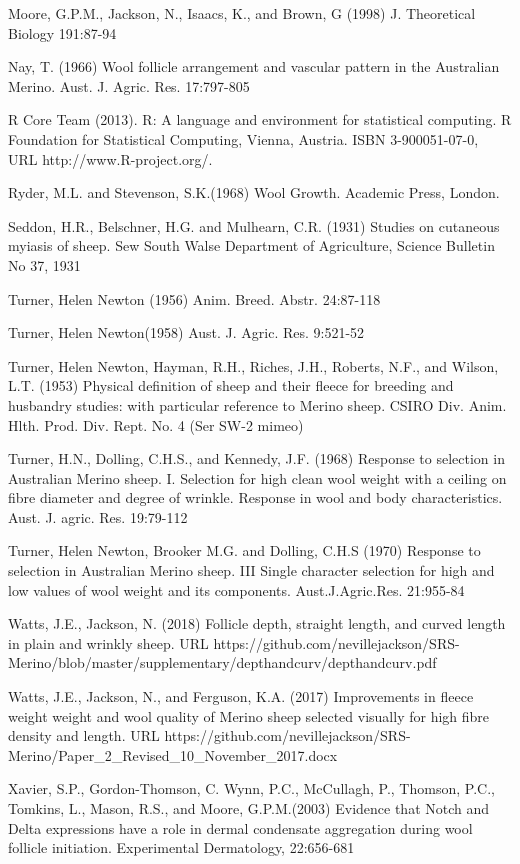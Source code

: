 \documentclass[titlepage]{article}  %
\begin{document}
\begin{thebibliography}{99}
Moore, G.P.M., Jackson, N., Isaacs, K., and Brown, G (1998) J. Theoretical Biology 191:87-94

Nay, T. (1966) Wool follicle arrangement and vascular pattern in the Australian Merino. Aust. J. Agric. Res. 17:797-805

R Core Team (2013). R: A language and environment for statistical
  computing. R Foundation for Statistical Computing, Vienna, Austria.
  ISBN 3-900051-07-0, URL http://www.R-project.org/.

Ryder, M.L. and Stevenson, S.K.(1968) Wool Growth. Academic Press, London.

Seddon, H.R., Belschner, H.G. and Mulhearn, C.R. (1931)  Studies on cutaneous myiasis of sheep. Sew South Walse Department of Agriculture, Science Bulletin No 37, 1931

Turner, Helen Newton (1956) Anim. Breed. Abstr. 24:87-118

Turner, Helen Newton(1958) Aust. J. Agric. Res. 9:521-52

Turner, Helen Newton, Hayman, R.H., Riches, J.H., Roberts, N.F., and Wilson, L.T. (1953) Physical definition of sheep and their fleece for breeding and husbandry studies: with particular reference to Merino sheep. CSIRO Div. Anim. Hlth. Prod. Div. Rept. No. 4 (Ser SW-2 mimeo)

Turner, H.N., Dolling, C.H.S., and Kennedy, J.F. (1968) Response to selection in Australian Merino sheep. I. Selection for high clean wool weight with a ceiling on fibre diameter and degree of wrinkle. Response in wool and body characteristics. Aust. J. agric. Res. 19:79-112

Turner, Helen Newton, Brooker M.G. and Dolling, C.H.S (1970) Response to selection in Australian Merino sheep. III Single character selection for high and low values of wool weight and its components. Aust.J.Agric.Res. 21:955-84

Watts, J.E., Jackson, N. (2018) Follicle depth, straight length, and curved length in plain and wrinkly sheep. URL https://github.com/nevillejackson/SRS-Merino/blob/master/supplementary/depthandcurv/depthandcurv.pdf

Watts, J.E., Jackson, N., and Ferguson, K.A. (2017) Improvements in fleece weight weight and wool quality of Merino sheep selected visually for high fibre density and length. URL https://github.com/nevillejackson/SRS-Merino/Paper\_2\_Revised\_10\_November\_2017.docx 

Xavier, S.P., Gordon-Thomson, C. Wynn, P.C., McCullagh, P., Thomson, P.C., Tomkins, L., Mason, R.S., and Moore, G.P.M.(2003) Evidence that Notch and Delta expressions have a role in dermal condensate aggregation during wool follicle initiation. Experimental Dermatology, 22:656-681

\end{thebibliography}
\end{document}
